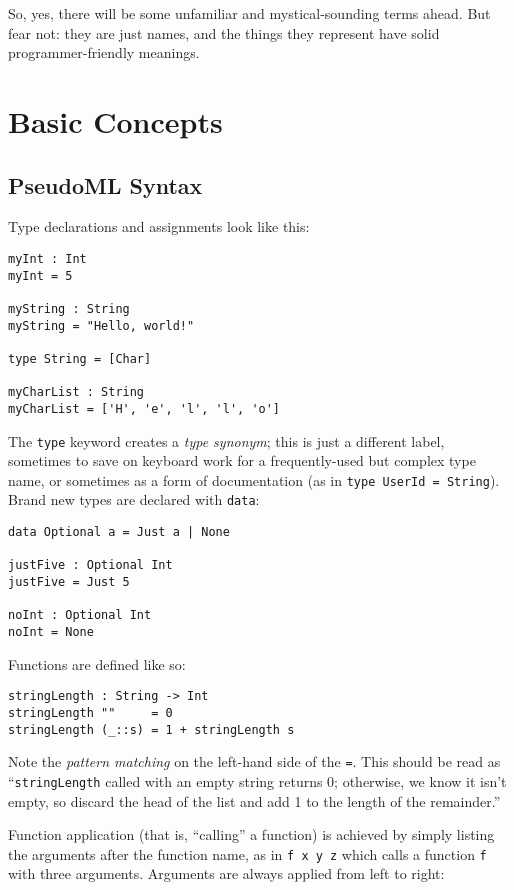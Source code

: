 \documentclass{book}
\newcommand{\mlil}[1]{\lstinline[language=pseudoml,columns=fixed]|#1|}\usepackage{caption}
\begin{document}
So, yes, there will be some unfamiliar and mystical-sounding terms ahead. But fear not: they are just names, and the things they represent have solid programmer-friendly meanings.

\chapter{Basic Concepts}

\section{PseudoML Syntax}\label{sec:pseudoml}

Type declarations and assignments look like this: 

\begin{lstlisting}[language=pseudoml]
myInt : Int
myInt = 5

myString : String
myString = "Hello, world!"

type String = [Char]

myCharList : String
myCharList = ['H', 'e', 'l', 'l', 'o']
\end{lstlisting}

The \mlil{type} keyword creates a \emph{type synonym}; this is just a different label, sometimes to save on keyboard work for a frequently-used but complex type name, or sometimes as a form of documentation (as in \mlil{type UserId = String}). Brand new types are declared with \mlil{data}:

\begin{lstlisting}[language=pseudoml]
data Optional a = Just a | None

justFive : Optional Int
justFive = Just 5

noInt : Optional Int
noInt = None
\end{lstlisting}

Functions are defined like so:

\begin{lstlisting}[language=pseudoml]
stringLength : String -> Int
stringLength ""     = 0
stringLength (_::s) = 1 + stringLength s
\end{lstlisting}

Note the \emph{pattern matching} on the left-hand side of the \mlil{=}. This should be read as ``\mlil{stringLength} called with an empty string returns 0; otherwise, we know it isn't empty, so discard the head of the list and add 1 to the length of the remainder.''

Function application (that is, ``calling'' a function) is achieved by simply listing the arguments after the function name, as in \mlil{f x y z} which calls a function \mlil{f} with three arguments. Arguments are always applied from left to right:
\end{document}
